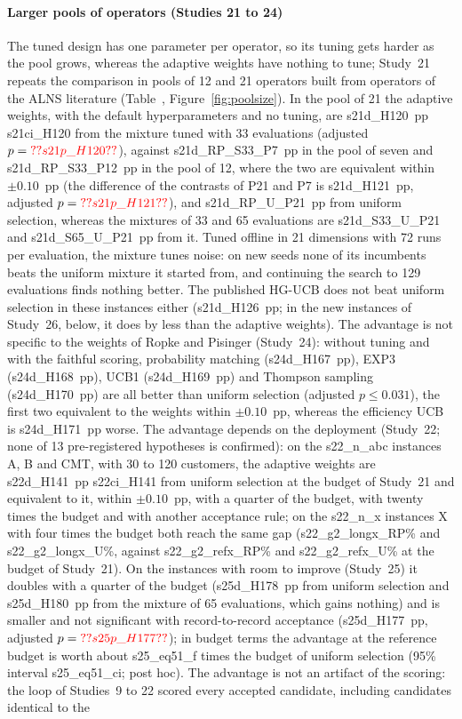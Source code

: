 \paragraph{Larger pools of operators (Studies 21 to 24)} The tuned design has one parameter per operator, so its tuning gets harder as the pool grows, whereas the adaptive weights have nothing to tune; Study~21 repeats the comparison in pools of 12 and 21 operators built from operators of the ALNS literature (Table~, Figure~\ref{fig:poolsize}). In the pool of 21 the adaptive weights, with the default hyperparameters and no tuning, are \num{s21d_H120}~pp \num{s21ci_H120} from the mixture tuned with 33 evaluations (adjusted $p=\num{s21p_H120}$), against \num{s21d_RP_S33_P7}~pp in the pool of seven and \num{s21d_RP_S33_P12}~pp in the pool of 12, where the two are equivalent within $\pm0.10$~pp (the difference of the contrasts of P21 and P7 is \num{s21d_H121}~pp, adjusted $p=\num{s21p_H121}$), and \num{s21d_RP_U_P21}~pp from uniform selection, whereas the mixtures of 33 and 65 evaluations are \num{s21d_S33_U_P21} and \num{s21d_S65_U_P21}~pp from it. Tuned offline in 21 dimensions with 72 runs per evaluation, the mixture tunes noise: on new seeds none of its incumbents beats the uniform mixture it started from, and continuing the search to 129 evaluations finds nothing better. The published HG-UCB does not beat uniform selection in these instances either (\num{s21d_H126}~pp; in the new instances of Study~26, below, it does by less than the adaptive weights). The advantage is not specific to the weights of Ropke and Pisinger (Study~24): without tuning and with the faithful scoring, probability matching (\num{s24d_H167}~pp), EXP3 (\num{s24d_H168}~pp), UCB1 (\num{s24d_H169}~pp) and Thompson sampling (\num{s24d_H170}~pp) are all better than uniform selection (adjusted $p\le0.031$), the first two equivalent to the weights within $\pm0.10$~pp, whereas the efficiency UCB is \num{s24d_H171}~pp worse. The advantage depends on the deployment (Study~22; none of 13 pre-registered hypotheses is confirmed): on the \num{s22_n_abc} instances A, B and CMT, with 30 to 120 customers, the adaptive weights are \num{s22d_H141}~pp \num{s22ci_H141} from uniform selection at the budget of Study~21 and equivalent to it, within $\pm0.10$~pp, with a quarter of the budget, with twenty times the budget and with another acceptance rule; on the \num{s22_n_x} instances X with four times the budget both reach the same gap (\num{s22_g2_longx_RP}\% and \num{s22_g2_longx_U}\%, against \num{s22_g2_refx_RP}\% and \num{s22_g2_refx_U}\% at the budget of Study~21). On the instances with room to improve (Study~25) it doubles with a quarter of the budget (\num{s25d_H178}~pp from uniform selection and \num{s25d_H180}~pp from the mixture of 65 evaluations, which gains nothing) and is smaller and not significant with record-to-record acceptance (\num{s25d_H177}~pp, adjusted $p=\num{s25p_H177}$); in budget terms the advantage at the reference budget is worth about \num{s25_eq51_f} times the budget of uniform selection (95\% interval \num{s25_eq51_ci}; post hoc). The advantage is not an artifact of the scoring: the loop of Studies~9 to 22 scored every accepted candidate, including candidates identical to the 